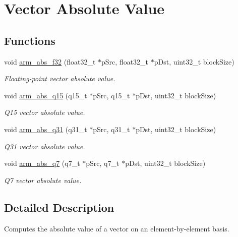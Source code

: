 \hypertarget{group__BasicAbs}{}\section{Vector Absolute Value}
\label{group__BasicAbs}
\subsection*{Functions}
\begin{DoxyCompactItemize}
\item 
void \hyperlink{group__BasicAbs_ga421b6275f9d35f50286c0ff3beceff02}{arm\+\_\+abs\+\_\+f32} (float32\+\_\+t $\ast$p\+Src, float32\+\_\+t $\ast$p\+Dst, uint32\+\_\+t block\+Size)
\begin{DoxyCompactList}\small\item\em Floating-\/point vector absolute value. \end{DoxyCompactList}\item 
void \hyperlink{group__BasicAbs_ga39f92964c9b649ba252e26ebe7b95594}{arm\+\_\+abs\+\_\+q15} (q15\+\_\+t $\ast$p\+Src, q15\+\_\+t $\ast$p\+Dst, uint32\+\_\+t block\+Size)
\begin{DoxyCompactList}\small\item\em Q15 vector absolute value. \end{DoxyCompactList}\item 
void \hyperlink{group__BasicAbs_ga59eafcdcdb52da60d37f20aec6ff4577}{arm\+\_\+abs\+\_\+q31} (q31\+\_\+t $\ast$p\+Src, q31\+\_\+t $\ast$p\+Dst, uint32\+\_\+t block\+Size)
\begin{DoxyCompactList}\small\item\em Q31 vector absolute value. \end{DoxyCompactList}\item 
void \hyperlink{group__BasicAbs_gadc30985e33fbf96802a5a7954dece3b1}{arm\+\_\+abs\+\_\+q7} (q7\+\_\+t $\ast$p\+Src, q7\+\_\+t $\ast$p\+Dst, uint32\+\_\+t block\+Size)
\begin{DoxyCompactList}\small\item\em Q7 vector absolute value. \end{DoxyCompactList}\end{DoxyCompactItemize}


\subsection{Detailed Description}
Computes the absolute value of a vector on an element-\/by-\/element basis.


